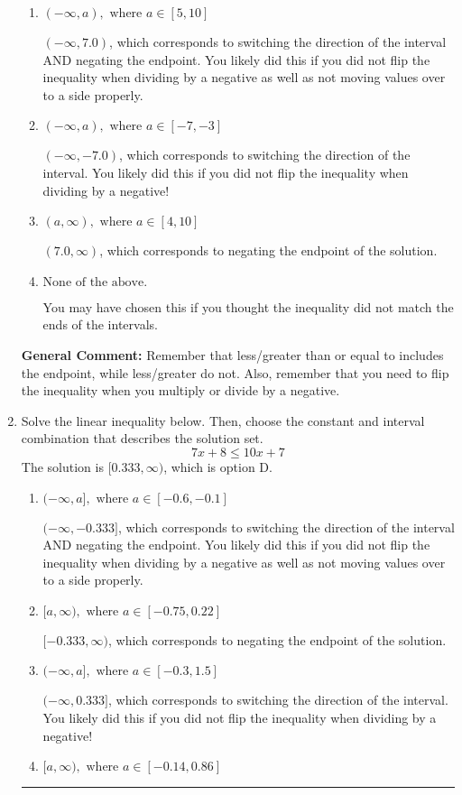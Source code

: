 \documentclass{extbook}[14pt]
\newcommand{\litem}[1]{\item #1

\rule{\textwidth}{0.4pt}}
\begin{document}
\begin{enumerate}
{\begin{enumerate}[label=\Alph*.]
* $(-7.0, \infty)$, which is the correct option.
\item \( (-\infty, a), \text{ where } a \in [5, 10] \)

 $(-\infty, 7.0)$, which corresponds to switching the direction of the interval AND negating the endpoint. You likely did this if you did not flip the inequality when dividing by a negative as well as not moving values over to a side properly.
\item \( (-\infty, a), \text{ where } a \in [-7, -3] \)

 $(-\infty, -7.0)$, which corresponds to switching the direction of the interval. You likely did this if you did not flip the inequality when dividing by a negative!
\item \( (a, \infty), \text{ where } a \in [4, 10] \)

 $(7.0, \infty)$, which corresponds to negating the endpoint of the solution.
\item \( \text{None of the above}. \)

You may have chosen this if you thought the inequality did not match the ends of the intervals.
\end{enumerate}

\textbf{General Comment:} Remember that less/greater than or equal to includes the endpoint, while less/greater do not. Also, remember that you need to flip the inequality when you multiply or divide by a negative.
}
\litem{
Solve the linear inequality below. Then, choose the constant and interval combination that describes the solution set.
\[ 7x + 8 \leq 10x + 7 \]The solution is \( [0.333, \infty) \), which is option D.\begin{enumerate}[label=\Alph*.]
\item \( (-\infty, a], \text{ where } a \in [-0.6, -0.1] \)

 $(-\infty, -0.333]$, which corresponds to switching the direction of the interval AND negating the endpoint. You likely did this if you did not flip the inequality when dividing by a negative as well as not moving values over to a side properly.
\item \( [a, \infty), \text{ where } a \in [-0.75, 0.22] \)

 $[-0.333, \infty)$, which corresponds to negating the endpoint of the solution.
\item \( (-\infty, a], \text{ where } a \in [-0.3, 1.5] \)

 $(-\infty, 0.333]$, which corresponds to switching the direction of the interval. You likely did this if you did not flip the inequality when dividing by a negative!
\item \( [a, \infty), \text{ where } a \in [-0.14, 0.86] \)


\end{enumerate}}
\end{enumerate}
\end{document}
